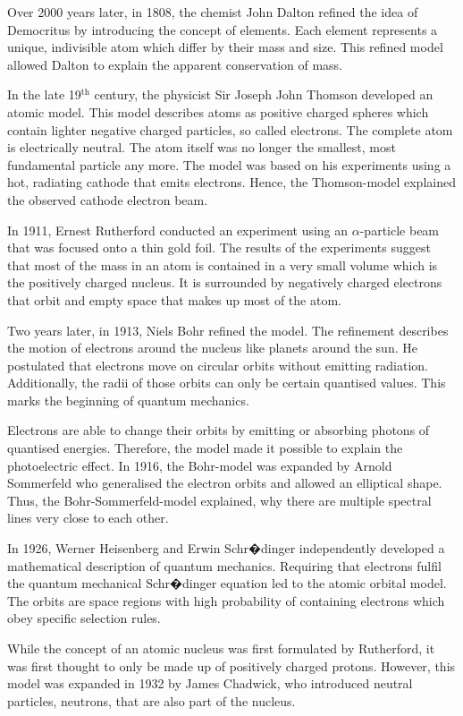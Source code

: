 \documentclass[bachelor,oneside, BCOR10mm,
			ngerman,english  %
]{GAUBM}
\begin{document}
Over 2000 years later, in 1808, the chemist John Dalton refined the idea of Democritus by introducing the concept of elements. Each element represents a unique, indivisible atom which differ by their mass and size. This refined model allowed Dalton to explain the apparent conservation of mass.

In the late 19$^\text{th}$ century, the physicist Sir Joseph John Thomson developed an atomic model. This model describes atoms as positive charged spheres which contain lighter negative charged particles, so called electrons. The complete atom is electrically neutral. The atom itself was no longer the smallest, most fundamental particle any more. The model was based on his experiments using a hot, radiating cathode that emits electrons. Hence, the Thomson-model explained the observed cathode electron beam.

In 1911, Ernest Rutherford conducted an experiment using an $\alpha$-particle beam that was focused onto a thin gold foil. The results of the experiments suggest that most of the mass in an atom is contained in a very small volume which is the positively charged nucleus. It is surrounded by negatively charged electrons that orbit and empty space that makes up most of the atom.

Two years later, in 1913, Niels Bohr refined the model. The refinement describes the motion of electrons around the nucleus like planets around the sun. He postulated that electrons move on circular orbits without emitting radiation. Additionally, the radii of those orbits can only be certain quantised values. This marks the beginning of quantum mechanics. 

Electrons are able to change their orbits by emitting or absorbing photons of quantised energies. Therefore, the model made it possible to explain the photoelectric effect. In 1916, the Bohr-model was expanded by Arnold Sommerfeld who generalised the electron orbits and allowed an elliptical shape. Thus, the Bohr-Sommerfeld-model explained, why there are multiple spectral lines very close to each other.

In 1926, Werner Heisenberg and Erwin Schr�dinger independently developed a mathematical description of quantum mechanics. Requiring that electrons fulfil the quantum mechanical Schr�dinger equation led to the atomic orbital model. The orbits are space regions with high probability of containing electrons which obey specific selection rules. 

While the concept of an atomic nucleus was first formulated by Rutherford, it was first thought to only be made up of positively charged protons. However, this model was expanded in 1932 by James Chadwick, who introduced neutral particles, neutrons, that are also part of the nucleus.  
\end{document}
